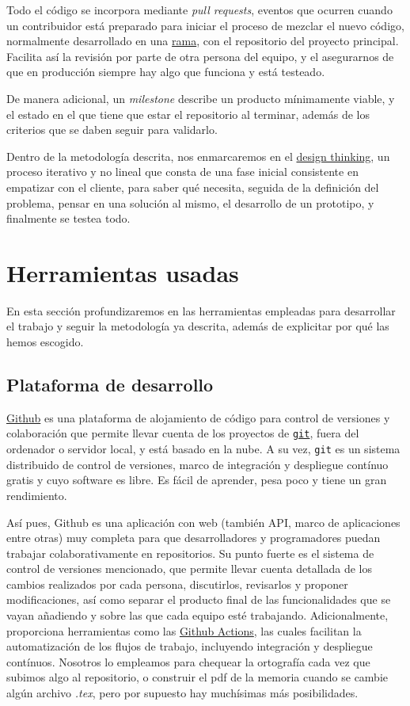 Todo el código se incorpora mediante \textit{pull requests}, eventos que ocurren cuando un contribuidor está 
preparado para iniciar el proceso de mezclar el nuevo código, normalmente desarrollado en una \href{https://docs.github.com/github/collaborating-with-issues-and-pull-requests/about-branches}{rama}, 
con el repositorio del proyecto principal. Facilita así la revisión por parte de otra persona del equipo, y el 
asegurarnos de que en producción siempre hay algo que funciona y está testeado.

De manera adicional, un \textit{milestone} describe un producto mínimamente viable, y el estado en el que tiene 
que estar el repositorio al terminar, además de los criterios que se daben seguir 
para validarlo.

Dentro de la metodología descrita, nos enmarcaremos en el \href{https://www.iebschool.com/blog/design-thinking-agile-scrum/}{design thinking}, 
un proceso iterativo y no lineal que consta de una fase inicial consistente en empatizar con el 
cliente, para saber qué necesita, seguida de la definición del problema, pensar en una solución al 
mismo, el desarrollo de un prototipo, y finalmente se testea todo. 

\section{Herramientas usadas}
En esta sección profundizaremos en las herramientas empleadas para desarrollar el trabajo y seguir 
la metodología ya descrita, además de explicitar por qué las hemos escogido.

\subsection{Plataforma de desarrollo} 
\href{https://github.com/}{Github} es una plataforma de alojamiento de código para control de versiones y 
colaboración que permite llevar cuenta de los proyectos de \href{https://git-scm.com/}{\tt git}, fuera del ordenador o 
servidor local, y está basado en la nube. A su vez, {\tt git} es un 
sistema distribuido de control de versiones, marco de integración y despliegue contínuo gratis y cuyo software es libre. Es fácil de 
aprender, pesa poco y tiene un gran rendimiento.

Así pues, Github es una aplicación con web (también API, marco de aplicaciones entre otras) muy completa 
para que desarrolladores y programadores puedan trabajar colaborativamente 
en repositorios. Su punto fuerte es el sistema de control de versiones mencionado, que permite llevar 
cuenta detallada 
de los cambios realizados por cada persona, discutirlos, revisarlos y proponer modificaciones, así como 
separar el producto final de las funcionalidades que se vayan añadiendo y sobre las que cada equipo esté 
trabajando. Adicionalmente, proporciona herramientas como las \href{https://github.com/features/actions}{Github Actions}, 
las cuales facilitan la automatización de los flujos de trabajo, incluyendo integración y despliegue contínuos.
Nosotros lo empleamos para chequear la ortografía cada vez que subimos algo al repositorio, o construir el pdf 
de la memoria cuando se cambie algún archivo \textit{.tex}, pero por supuesto hay muchísimas más posibilidades.

